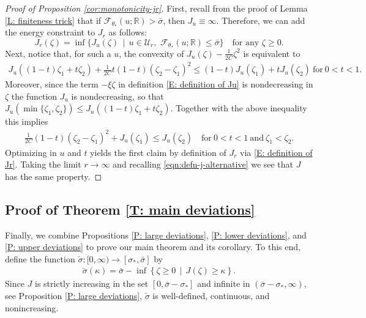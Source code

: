\documentclass[12pt]{amsart}
\begin{document}
		
\begin{proof}[Proof of Proposition \ref{cor:monotonicity-jr}]
	First, recall from the proof of Lemma \ref{L: finiteness trick} that if $\mathscr{F}_{\theta_{*}}(u;\mathbb{R}) > \bar{\sigma}$, then $J_{u} \equiv \infty$.  Therefore, we can add the energy constraint to $J_{r}$ as follows:
		\begin{equation*}
			J_{r}(\zeta) = \inf \{ J_{u}(\zeta) \, \mid \, u \in \mathcal{U}_{r}, \, \, \mathscr{F}_{\theta_{*}}(u;\mathbb{R}) \leq \bar{\sigma} \} \quad \text{for any} \, \, \zeta \geq 0.
		\end{equation*}
	Next, notice that, for such a $u$, the convexity of $ J_{ u } ( \zeta ) - \frac{ 1 }{ 2 C } \zeta^2 $ is equivalent to
	\begin{align*}
		J_{ u } ( ( 1 - t ) \zeta_1 + t \zeta_2 ) + \frac{ 1 }{ 2 C } t ( 1 - t ) ( \zeta_2 - \zeta_1 )^2  
		\leq (1 - t ) J_{ u } ( \zeta_1 ) + t J_{ u } ( \zeta_2 ) 
		~ \text{for} ~ 0 < t < 1 .
	\end{align*}
	Moreover, since the term $ - \xi \zeta $ in definition \eqref{E: definition of Ju} is nondecreasing in $ \zeta $ the function $ J_{ u } $ is nondecreasing, so that $ J_{ u } ( \min \{ \zeta_1, \zeta_2 \} ) \leq J_{ u } ( ( 1 - t ) \zeta_1 + t \zeta_2 ) $. Together with the above inequality this implies
	\begin{align*}
		\frac{ 1 }{ 2 C } ( 1 - t ) ( \zeta_2 - \zeta_1 )^2 + J_{ u } ( \zeta_1 ) 
		\leq J_{ u } ( \zeta_2 ) 
		\quad \text{for} ~ 0 < t < 1  ~ \text{and} ~ \zeta_1 < \zeta_2 .
	\end{align*}
	Optimizing in $ u $ and $ t $ yields the first claim by definition of $ J_{ r } $ via \eqref{E: definition of Jr}. Taking the limit $ r \rightarrow \infty $ and recalling \eqref{eqn:defn-j-alternative} we see that $ J $ has the same property. 
\end{proof}

\subsection{Proof of Theorem \ref{T: main deviations}} Finally, we combine Propositions \ref{P: large deviations}, \ref{P: lower deviations}, and \ref{P: upper deviations} to prove our main theorem and its corollary.  To this end, define the function $\check{\sigma} : [0,\infty) \to [\sigma_{*},\bar{\sigma}]$ by 
	\begin{align}\label{eqn:defn-sigma-check}
		\check{\sigma}(\kappa) = \bar{\sigma} - \inf \left\{ \zeta \geq 0 \, \mid \, J(\zeta) \geq \kappa \right\}.
	\end{align}
Since $J$ is strictly increasing in the set $ [ 0 , \bar\sigma - \sigma_{ * } ] $ and infinite in $(\bar{\sigma} - \sigma_{*},\infty)$, see Proposition \ref{P: large deviations}, $\check{\sigma}$ is well-defined, continuous, and nonincreasing.
        
\end{document}
